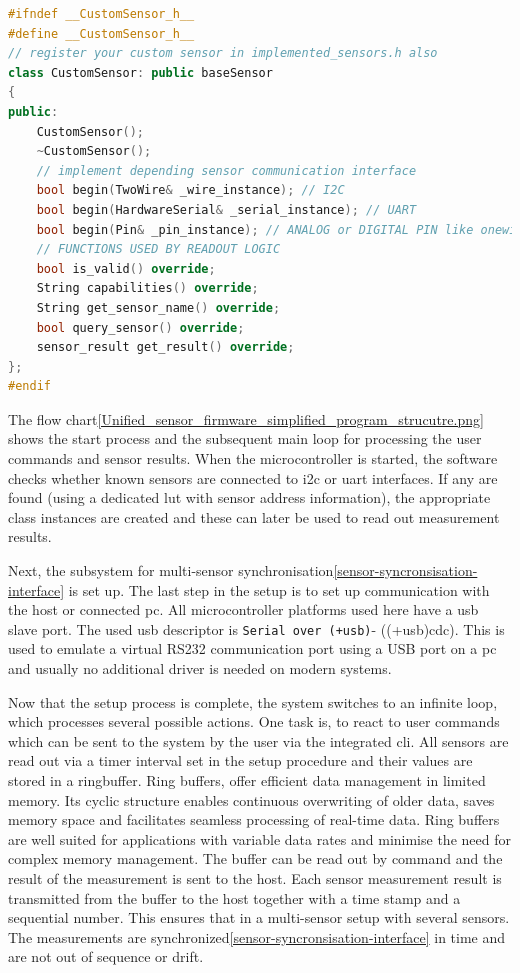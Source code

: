 \begin{lstlisting}[language={C++}, caption={CustomSensor-Class for adding new sensor hardware support}, label=lst:CustomSensorClass]
#ifndef __CustomSensor_h__
#define __CustomSensor_h__
// register your custom sensor in implemented_sensors.h also
class CustomSensor: public baseSensor
{
public:
    CustomSensor();
    ~CustomSensor();
    // implement depending sensor communication interface
    bool begin(TwoWire& _wire_instance); // I2C
    bool begin(HardwareSerial& _serial_instance); // UART
    bool begin(Pin& _pin_instance); // ANALOG or DIGITAL PIN like onewire
    // FUNCTIONS USED BY READOUT LOGIC
    bool is_valid() override;
    String capabilities() override;
    String get_sensor_name() override;
    bool query_sensor() override;
    sensor_result get_result() override;        
};
#endif
\end{lstlisting}

The flow
chart\ref{Unified_sensor_firmware_simplified_program_strucutre.png}
shows the start process and the subsequent main loop for processing the
user commands and sensor results. When the microcontroller is started,
the software checks whether known sensors are connected to \gls{i2c} or
\gls{uart} interfaces. If any are found (using a dedicated \gls{lut}
with sensor address information), the appropriate class instances are
created and these can later be used to read out measurement results.

Next, the subsystem for multi-sensor
synchronisation\ref{sensor-syncronsisation-interface} is set up. The
last step in the setup is to set up communication with the host or
connected \gls{pc}. All microcontroller platforms used here have a
\gls{usb} slave port. The used usb descriptor is
\passthrough{\lstinline!Serial over (+usb)!}- ((+usb)\gls{cdc}). This is
used to emulate a virtual RS232 communication port using a USB port on a
\gls{pc} and usually no additional driver is needed on modern systems.

Now that the setup process is complete, the system switches to an
infinite loop, which processes several possible actions. One task is, to
react to user commands which can be sent to the system by the user via
the integrated \gls{cli}. All sensors are read out via a timer interval
set in the setup procedure and their values are stored in a ringbuffer.
Ring buffers, offer efficient data management in limited memory. Its
cyclic structure enables continuous overwriting of older data, saves
memory space and facilitates seamless processing of real-time data. Ring
buffers are well suited for applications with variable data rates and
minimise the need for complex memory management. The buffer can be read
out by command and the result of the measurement is sent to the host.
Each sensor measurement result is transmitted from the buffer to the
host together with a time stamp and a sequential number. This ensures
that in a multi-sensor setup with several sensors. The measurements are
synchronized\ref{sensor-syncronsisation-interface} in time and are not
out of sequence or drift.

